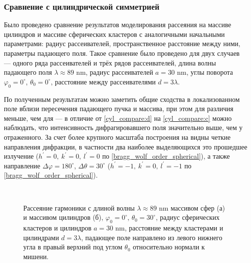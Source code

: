 \subsubsection{Сравнение с цилиндрической симметрией}

Было проведено сравнение результатов моделирования рассеяния на массиве цилиндров и массиве сферических кластеров с аналогичными начальными параметрами: радиус рассеивателей, пространственное расстояние между ними, параметры падающего поля. Такое сравнение было проведено для двух случаев --- одного ряда рассеивателей и трёх рядов рассеивателей, длина волны падающего поля $\lambda \approx 89$ nm, радиус рассеивателей $a = 30$ nm, углы поворота $\varphi_0 = 0^\circ$, $\theta_0 = 0^\circ$, расстояние между рассеивателями $d = 3\lambda$.

По полученным результатам можно заметить общие сходства в локализованном поле вблизи пересечения падающего пучка и массива, при этом для  различия меньше, чем для  --- в отличие от \autoref{cyl_compare:d} на \autoref{cyl_compare:c} можно наблюдать, что интенсивность дифрагировавшего поля значительно выше, чем у отраженного. За счет более крупного масштаба построения на  видны четкие направления дифракции, в частности два наиболее выделяющихся это прошедшее излучение ($h^\prime = 0,\:k^\prime = 0,\:l^\prime = 0$ по \autoref{bragg_wolf_order_spherical}), а также направление $\Delta \varphi = 180^\circ$, $\Delta \theta = 30^\circ$ ($h^\prime = -1,\:k^\prime = 0,\:l^\prime = -1$ по \autoref{bragg_wolf_order_spherical}).

\begin{figure}[H]
    \hfil
    \\
    \hfil
    \caption{Рассеяние гармоники с длиной волны $\lambda \approx 89$ nm массивом сфер (а) и массивом цилиндров (б), $\varphi_0 = 0^\circ$, $\theta_0 = 30^\circ$, радиус сферических кластеров и цилиндров $a = 30$ nm, расстояние между кластерами и цилиндрами $d = 3\lambda$, падающее поле направлено из левого нижнего угла в правый верхний под углом $\theta_0$ относительно нормали к мишени.}\label{cyl_compare:image}
\end{figure}

